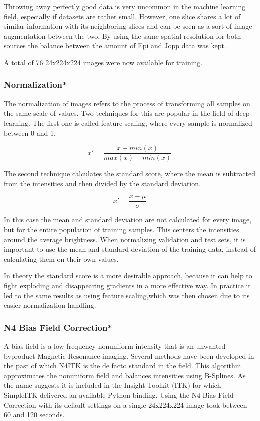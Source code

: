 Throwing away perfectly good data is very uncommon in the machine learning field, especially if datasets are rather small. However, one slice shares a lot of similar information with its neighboring slices and can be seen as a sort of image augmentation between the two. By using the same spatial resolution for both sources the balance between the amount of Epi and Jopp data was kept.

A total of 76 24x224x224 images were now available for training.

\subsubsection{Normalization*}

The normalization of images refers to the process of transforming all samples on the same scale of values. Two techniques for this are popular in the field of deep learning. The first one is called feature scaling, where every sample is normalized between 0 and 1.

\begin{equation}
x' = \frac {x - min(x)}{max(x) - min(x)}
\end{equation}

The second technique calculates the standard score, where the mean is subtracted from the intensities and then divided by the standard deviation.

\begin{equation}
x' = \frac {x - \mu}{\sigma}
\end{equation}

In this case the mean and standard deviation are not calculated for every image, but for the entire population of training samples. This centers the intensities around the average brightness. When normalizing validation and test sets, it is important to use the mean and standard deviation of the training data, instead of calculating them on their own values.

In theory the standard score is a more desirable approach, because it can help to fight exploding and disappearing gradients in a more effective way. In practice it led to the same results as using feature scaling,which was then chosen due to its easier normalization handling.

\subsubsection{N4 Bias Field Correction*}

A bias field is a low frequency nonuniform intensity that is an unwanted byproduct Magnetic Resonance imaging. Several methods have been developed in the past of which N4ITK \cite{Tustison2010} is the de facto standard in the field. This algorithm approximates the nonuniform field and balances intensities using B-Splines. As the name suggests it is included in the Insight Toolkit (ITK) for which SimpleITK delivered an available Python binding. Using the N4 Bias Field Correction with its default settings on a single 24x224x224 image took between 60 and 120 seconds.

